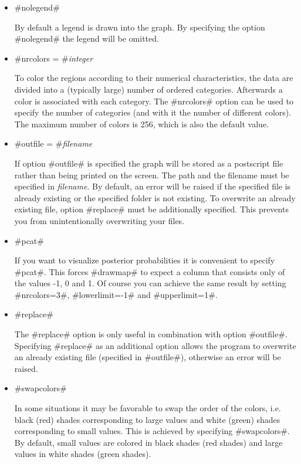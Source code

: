 \begin{itemize}
{\em mapname} specifies the name of the {\em map object}
containing the boundary information of the map to be drawn. This
option must always be specified.

\item #nolegend#

By default a legend is drawn into the graph. By specifying the
option #nolegend# the legend will be omitted.

\item #nrcolors = #{\em integer}

To color the regions according to their numerical characteristics,
the data are divided into a (typically large) number of ordered
categories. Afterwards a color is associated with each category.
The #nrcolors# option can be used to specify the number of
categories (and with it the number of different colors). The
maximum number of colors is 256, which is also the default value.

\item #outfile = #{\em filename}

If option #outfile# is specified the graph will be stored as a
postscript file rather than being printed on the screen. The path
and the filename must be specified in {\em filename}. By
default, an error will be raised if the specified file  is already
existing or the specified folder is not existing. To overwrite  an
already existing file, option #replace# must be additionally
specified. This prevents you from unintentionally overwriting your
files.

\item #pcat#

If you want to visualize posterior probabilities it is convenient to
specify #pcat#. This forces #drawmap# to expect a column that
consists only of the values -1, 0 and 1. Of course you can achieve
the same result by setting #nrcolors=3#, #lowerlimit=-1# and
#upperlimit=1#.

\item #replace#

The #replace# option is only useful in combination with option
#outfile#. Specifying #replace# as an additional option allows the
program to overwrite an already existing file (specified in
#outfile#), otherwise an error will be raised.

\item #swapcolors#

In some situations it may be favorable to swap the order of the
colors, i.e. black (red) shades corresponding to large values and
white (green) shades corresponding to small values. This is
achieved by specifying #swapcolors#. By default, small values are
colored in black shades (red shades) and large values in white
shades (green shades).


\end{itemize}
